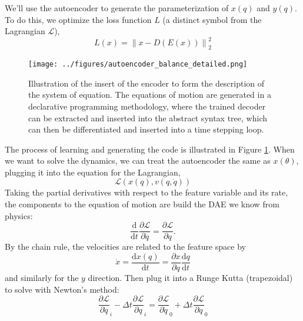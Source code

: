 \documentclass[AMA,STIX1COL]{WileyNJD-v2}
\begin{document}
We'll use the autoencoder to generate the parameterization of \(x(q)\)
and \(y(q)\). To do this, we optimize the loss function $L$ (a
distinct symbol from the Lagrangian $\mathcal{L}$),
\begin{equation}
L(x) = \left\| x-D(E(x)) \right\|_2^2
\end{equation}

\begin{figure}
  \center
\texttt{[image: ../figures/autoencoder\_balance\_detailed.png]}
  \caption{\label{fig:balance}Illustration of the insert of the encoder to form the
  description of the system of equation. The equations
  of motion are generated in a declarative programming methodology,
  where the trained decoder can be extracted and inserted into the abstract
  syntax tree, which can then be differentiated and inserted into a
  time stepping loop.}
\end{figure}

The process of learning and generating the code is illustrated in
Figure \ref{fig:balance}.
When we want to solve the dynamics, we can treat the autoencoder the
same as \(x(\theta)\), plugging it into the equation for the Lagrangian,
\begin{equation}
  \mathcal{L}(x(q),v(q,\dot{q}))
\end{equation}
Taking the partial derivatives with respect to the feature variable and
its rate, the components to the equation of motion are build the DAE we know from physics:
\begin{equation}
  \frac{\mathrm{d}}{\mathrm{d}t}\frac{\partial \mathcal{L}}{\partial \dot{q}} =
  \frac{\partial \mathcal{L}}{\partial q}.
\end{equation}
By the chain rule, the velocities are related to the
feature space by
\begin{equation}
\dot{x} = \frac{\mathrm{d}x(q)}{\mathrm{d}t} = \frac{\partial x}{\partial q}\frac{\mathrm{d}q}{\mathrm{d}t}
\end{equation}
and similarly for the \(y\) direction.
Then plug it into a Runge Kutta (trapezoidal) to solve with Newton's
method:
\begin{equation}
\frac{\partial \mathcal{L}}{\partial \dot{q}}_i - \Delta t
\frac{\partial \mathcal{L}}{\partial q}_i = \frac{\partial
  \mathcal{L}}{\partial \dot{q}}_0 + \Delta t \frac{\partial
  \mathcal{L}}{\partial q}_0
\end{equation}
\end{document}
